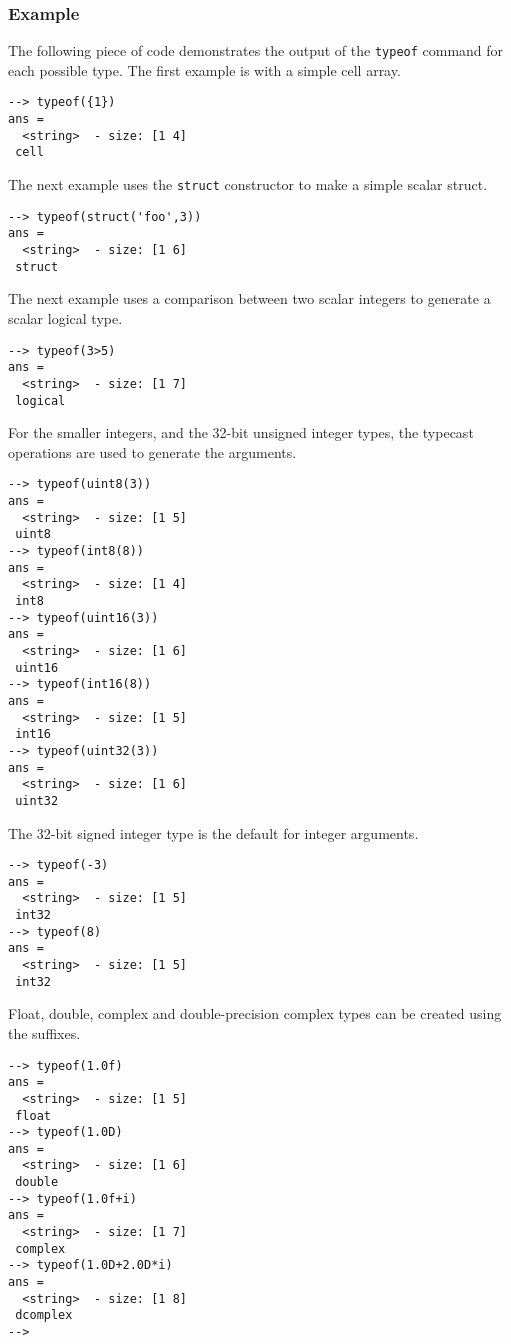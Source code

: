 \subsubsection{Example}
The following piece of code demonstrates the output of the \verb|typeof| command for each possible type.  The first example is with a simple cell array.
\begin{verbatim}
--> typeof({1})
ans =
  <string>  - size: [1 4]
 cell
\end{verbatim}
The next example uses the \verb|struct| constructor to make a simple scalar struct.
\begin{verbatim}
--> typeof(struct('foo',3))
ans =
  <string>  - size: [1 6]
 struct
\end{verbatim}
The next example uses a comparison between two scalar integers to generate a scalar logical type.
\begin{verbatim}
--> typeof(3>5)
ans =
  <string>  - size: [1 7]
 logical
\end{verbatim}
For the smaller integers, and the 32-bit unsigned integer types, the typecast operations are used to generate the arguments.
\begin{verbatim}
--> typeof(uint8(3))
ans =
  <string>  - size: [1 5]
 uint8
--> typeof(int8(8))
ans =
  <string>  - size: [1 4]
 int8
--> typeof(uint16(3))
ans =
  <string>  - size: [1 6]
 uint16
--> typeof(int16(8))
ans =
  <string>  - size: [1 5]
 int16
--> typeof(uint32(3))
ans =
  <string>  - size: [1 6]
 uint32
\end{verbatim}
The 32-bit signed integer type is the default for integer arguments.
\begin{verbatim}
--> typeof(-3)
ans =
  <string>  - size: [1 5]
 int32
--> typeof(8)
ans =
  <string>  - size: [1 5]
 int32
\end{verbatim}
Float, double, complex and double-precision complex types can be created using the suffixes.
\begin{verbatim}
--> typeof(1.0f)
ans =
  <string>  - size: [1 5]
 float
--> typeof(1.0D)
ans =
  <string>  - size: [1 6]
 double
--> typeof(1.0f+i)
ans =
  <string>  - size: [1 7]
 complex
--> typeof(1.0D+2.0D*i)
ans =
  <string>  - size: [1 8]
 dcomplex
-->
\end{verbatim}
